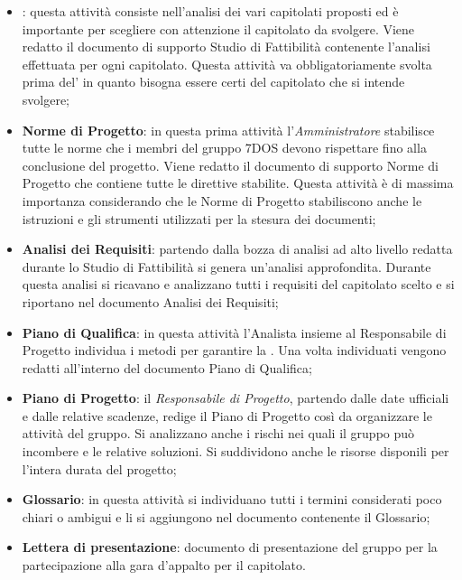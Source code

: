 \begin{itemize}

	\item \textbf{}: questa attività consiste nell'analisi dei vari capitolati proposti ed è importante per scegliere con attenzione il capitolato da svolgere. Viene redatto il documento di supporto Studio di Fattibilità contenente l'analisi effettuata per ogni capitolato. Questa attività va obbligatoriamente svolta prima del' in quanto bisogna essere certi del capitolato che si intende svolgere;

	\item \textbf{Norme di Progetto}: in questa prima attività l'\emph{Amministratore} stabilisce tutte le norme che i membri del gruppo 7DOS devono rispettare fino alla conclusione del progetto. Viene redatto il documento di supporto Norme di Progetto che contiene tutte le direttive stabilite. Questa attività è di massima importanza considerando che le Norme di Progetto stabiliscono anche le istruzioni e gli strumenti utilizzati per la stesura dei documenti;

	\item \textbf{Analisi dei Requisiti}: partendo dalla bozza di analisi ad alto livello redatta durante lo Studio di Fattibilità si genera un'analisi approfondita. Durante questa analisi si ricavano e analizzano tutti i requisiti del capitolato scelto e si riportano nel documento Analisi dei Requisiti;

	\item \textbf{Piano di Qualifica}: in questa attività l'Analista insieme al Responsabile di Progetto individua i metodi per garantire la . Una volta individuati vengono redatti all'interno del documento Piano di Qualifica;

	\item \textbf{Piano di Progetto}: il \emph{Responsabile di Progetto}, partendo dalle date ufficiali e dalle relative scadenze, redige il Piano di Progetto così da organizzare le attività del gruppo. Si analizzano anche i rischi nei quali il gruppo può incombere e le relative soluzioni. Si suddividono anche le risorse disponili per l'intera durata del progetto;

	\item \textbf{Glossario}: in questa attività si individuano tutti i termini considerati poco chiari o ambigui e li si aggiungono nel documento contenente il Glossario;
	
	\item \textbf{Lettera di presentazione}: documento di presentazione del gruppo per la partecipazione alla gara d'appalto per il capitolato.

\end{itemize}

